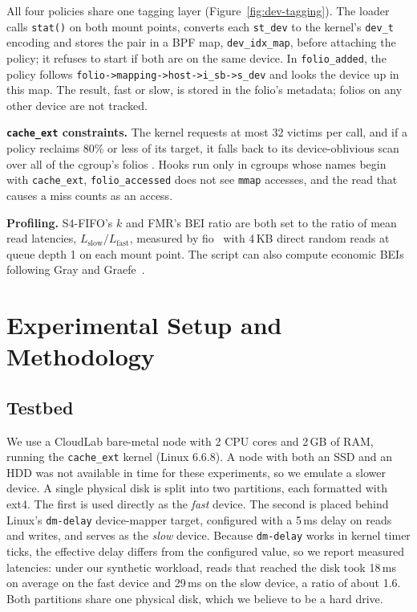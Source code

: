 \documentclass[11pt,sigconf,nonacm]{acmart}
\newcommand{\cacheExt}{\texttt{cache\_ext}}
\begin{document}
All four policies share one tagging layer (Figure~\ref{fig:dev-tagging}). The loader calls \texttt{stat()} on both mount points, converts each \texttt{st\_dev} to the kernel's \texttt{dev\_t} encoding and stores the pair in a BPF map, \texttt{dev\_idx\_map}, before attaching the policy; it refuses to start if both are on the same device. In \texttt{folio\_added}, the policy follows \texttt{folio->mapping->host->i\_sb->s\_dev} \newline and looks the device up in this map. The result, fast or slow, is stored in the folio's metadata; folios on any other device are not tracked.

\textbf{\cacheExt{} constraints.} The kernel requests at most 32 victims per call, and if a policy reclaims 80\% or less of its target, it falls back to its device-oblivious scan over all of the cgroup's folios \cite{cache_ext}. Hooks run only in cgroups whose names begin with \texttt{cache\_ext}, \texttt{folio\_accessed} does not see \texttt{mmap} accesses, and the read that causes a miss counts as an access.

\textbf{Profiling.} S4-FIFO's $k$ and FMR's BEI ratio are both set to the ratio of mean read latencies, $L_\text{slow}/L_\text{fast}$, measured by fio~\cite{fio} with 4\,KB direct random reads at queue depth 1 on each mount point. The script can also compute economic BEIs following Gray and Graefe~\cite{gray1997fiveminute}.

\section{Experimental Setup and Methodology}
\label{sec:setup}

\subsection{Testbed}

We use a CloudLab bare-metal node with 2 CPU cores and 2\,GB of RAM, running the \cacheExt{} kernel (Linux 6.6.8). A node with both an SSD and an HDD was not available in time for these experiments, so we emulate a slower device. A single physical disk is split into two partitions, each formatted with ext4. The first is used directly as the \emph{fast} device. The second is placed behind Linux's \texttt{dm-delay} device-mapper target, configured with a 5\,ms delay on reads and writes, and serves as the \emph{slow} device. Because \texttt{dm-delay} works in kernel timer ticks, the effective delay differs from the configured value, so we report measured latencies: under our synthetic workload, reads that reached the disk took 18\,ms on average on the fast device and 29\,ms on the slow device, a ratio of about 1.6. Both partitions share one physical disk, which we believe to be a hard drive. 
\end{document}
